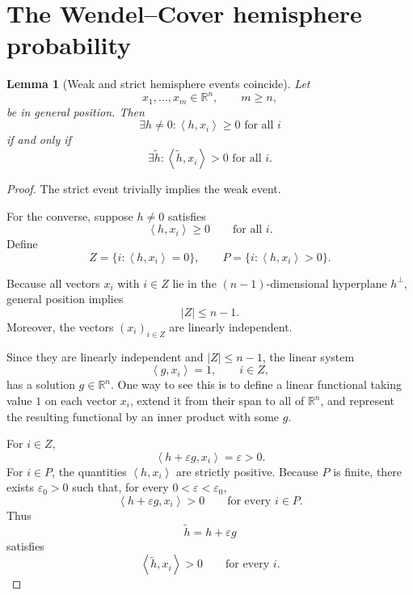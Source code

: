 \documentclass[11pt]{article}
\newtheorem{lemma}[theorem]{Lemma}
\newcommand{\R}{\mathbb{R}}
\newcommand{\ip}[2]{\left\langle #1,#2\right\rangle}
\newcommand{\1}{\mathbf{1}}
\begin{document}
\section{The Wendel--Cover hemisphere probability}

\begin{lemma}[Weak and strict hemisphere events coincide]
\label{lem:weak-strict}
Let
\[
x_1,\dots,x_m\in\R^n,
\qquad
m\ge n,
\]
be in general position. Then
\[
\exists h\neq 0:
\ip{h}{x_i}\ge 0
\text{ for all }i
\]
if and only if
\[
\exists \widetilde h:
\ip{\widetilde h}{x_i}>0
\text{ for all }i.
\]
\end{lemma}

\begin{proof}
The strict event trivially implies the weak event.

For the converse, suppose \(h\neq 0\) satisfies
\[
\ip{h}{x_i}\ge 0
\qquad
\text{for all }i.
\]
Define
\[
Z=\{i:\ip{h}{x_i}=0\},
\qquad
P=\{i:\ip{h}{x_i}>0\}.
\]

Because all vectors \(x_i\) with \(i\in Z\) lie in the
\((n-1)\)-dimensional hyperplane \(h^\perp\), general position implies
\[
|Z|\le n-1.
\]
Moreover, the vectors \((x_i)_{i\in Z}\) are linearly independent.

Since they are linearly independent and \(|Z|\le n-1\), the linear
system
\[
\ip{g}{x_i}=1,
\qquad
i\in Z,
\]
has a solution \(g\in\R^n\). One way to see this is to define a linear
functional taking value \(1\) on each vector \(x_i\), extend it from
their span to all of \(\R^n\), and represent the resulting functional by
an inner product with some \(g\).

For \(i\in Z\),
\[
\ip{h+\varepsilon g}{x_i}
=
\varepsilon>0.
\]
For \(i\in P\), the quantities \(\ip{h}{x_i}\) are strictly positive.
Because \(P\) is finite, there exists \(\varepsilon_0>0\) such that,
for every \(0<\varepsilon<\varepsilon_0\),
\[
\ip{h+\varepsilon g}{x_i}>0
\qquad
\text{for every }i\in P.
\]
Thus
\[
\widetilde h=h+\varepsilon g
\]
satisfies
\[
\ip{\widetilde h}{x_i}>0
\qquad
\text{for every }i.
\]
\end{proof}
\end{document}
